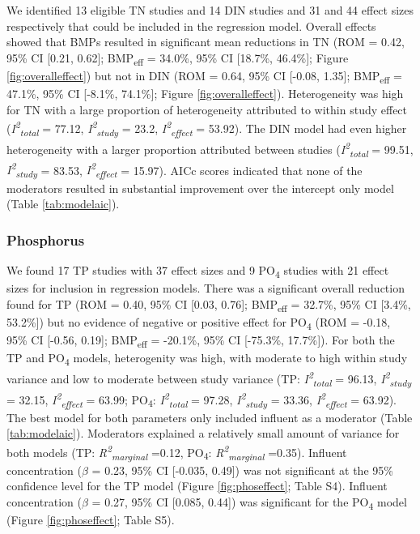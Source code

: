 \documentclass[utf8]{FrontiersinHarvard}
\begin{document}
We identified 13 eligible TN studies and 14 DIN studies and 31 and 44 effect sizes respectively that could be included in the regression model.
Overall effects showed that BMPs resulted in significant mean reductions in TN (ROM = 0.42, 95\% CI {[}0.21, 0.62{]}; BMP\textsubscript{eff} = 34.0\%, 95\% CI {[}18.7\%, 46.4\%{]}; Figure \ref{fig:overalleffect}) but not in DIN (ROM = 0.64, 95\% CI {[}-0.08, 1.35{]}; BMP\textsubscript{eff} = 47.1\%, 95\% CI {[}-8.1\%, 74.1\%{]}; Figure \ref{fig:overalleffect}).
Heterogeneity was high for TN with a large proportion of heterogeneity attributed to within study effect (\textit{I\textsuperscript{2}\textsubscript{total}} = 77.12, \textit{I\textsuperscript{2}\textsubscript{study}} = 23.2, \textit{I\textsuperscript{2}\textsubscript{effect}} = 53.92).
The DIN model had even higher heterogeneity with a larger proportion attributed between studies (\textit{I\textsuperscript{2}\textsubscript{total}} = 99.51, \textit{I\textsuperscript{2}\textsubscript{study}} = 83.53, \textit{I\textsuperscript{2}\textsubscript{effect}} = 15.97).
AICc scores indicated that none of the moderators resulted in substantial improvement over the intercept only model (Table \ref{tab:modelaic}).

\hypertarget{phosphorus}{%
\subsubsection{Phosphorus}\label{phosphorus}}

We found 17 TP studies with 37 effect sizes and 9 PO\textsubscript{4} studies with 21 effect sizes for inclusion in regression models.
There was a significant overall reduction found for TP (ROM = 0.40, 95\% CI {[}0.03, 0.76{]}; BMP\textsubscript{eff} = 32.7\%, 95\% CI {[}3.4\%, 53.2\%{]}) but no evidence of negative or positive effect for PO\textsubscript{4} (ROM = -0.18, 95\% CI {[}-0.56, 0.19{]}; BMP\textsubscript{eff} = -20.1\%, 95\% CI {[}-75.3\%, 17.7\%{]}).
For both the TP and PO\textsubscript{4} models, heterogenity was high, with moderate to high within study variance and low to moderate between study variance (TP: \textit{I\textsuperscript{2}\textsubscript{total}} = 96.13, \textit{I\textsuperscript{2}\textsubscript{study}} = 32.15, \textit{I\textsuperscript{2}\textsubscript{effect}} = 63.99; PO\textsubscript{4}: \textit{I\textsuperscript{2}\textsubscript{total}} = 97.28, \textit{I\textsuperscript{2}\textsubscript{study}} = 33.36, \textit{I\textsuperscript{2}\textsubscript{effect}} = 63.92).
The best model for both parameters only included influent as a moderator (Table \ref{tab:modelaic}).
Moderators explained a relatively small amount of variance for both models (TP: \textit{R\textsuperscript{2}\textsubscript{marginal}} =0.12, PO\textsubscript{4}: \textit{R\textsuperscript{2}\textsubscript{marginal}} =0.35).
Influent concentration (\(\beta\) = 0.23, 95\% CI {[}-0.035, 0.49{]}) was not significant at the 95\% confidence level for the TP model (Figure \ref{fig:phoseffect}; Table S4).
Influent concentration (\(\beta\) = 0.27, 95\% CI {[}0.085, 0.44{]}) was significant for the PO\textsubscript{4} model (Figure \ref{fig:phoseffect}; Table S5).
\end{document}
